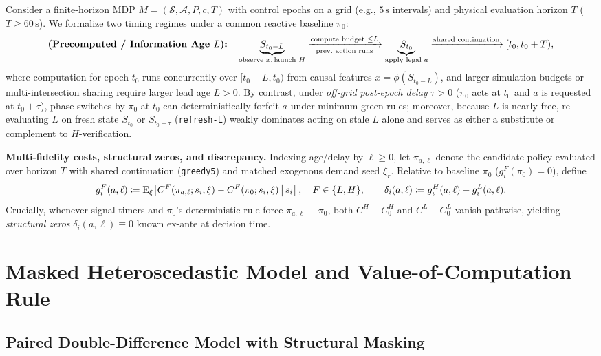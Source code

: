 Consider a finite-horizon MDP $M = (\mathcal{S}, \mathcal{A}, P, c, T)$ with control epochs on a grid (e.g., $5\,\mathrm{s}$ intervals) and physical evaluation horizon $T$ ($T \ge 60\,\mathrm{s}$). We formalize two timing regimes under a common reactive baseline $\pi_0$:
\[
\text{\textbf{(Precomputed / Information Age $L$):}}\quad
\underbrace{S_{t_0 - L}}_{\text{observe } x,\, \text{launch } H}
\xrightarrow[\text{prev.\ action runs}]{\text{compute budget } \le L}
\underbrace{S_{t_0}}_{\text{apply legal } a}
\xrightarrow{\text{shared continuation}}
[t_0, t_0 + T),
\]
where computation for epoch $t_0$ runs concurrently over $[t_0 - L, t_0)$ from causal features $x = \phi(S_{t_0 - L})$, and larger simulation budgets or multi-intersection sharing require larger lead age $L > 0$. By contrast, under \emph{off-grid post-epoch delay} $\tau > 0$ ($\pi_0$ acts at $t_0$ and $a$ is requested at $t_0 + \tau$), phase switches by $\pi_0$ at $t_0$ can deterministically forfeit $a$ under minimum-green rules; moreover, because $L$ is nearly free, re-evaluating $L$ on fresh state $S_{t_0}$ or $S_{t_0 + \tau}$ (\texttt{refresh-L}) weakly dominates acting on stale $L$ alone and serves as either a substitute or complement to $H$-verification.

\textbf{Multi-fidelity costs, structural zeros, and discrepancy.}
Indexing age/delay by $\ell \ge 0$, let $\pi_{a,\ell}$ denote the candidate policy evaluated over horizon $T$ with shared continuation (\texttt{greedy5}) and matched exogenous demand seed $\xi_r$. Relative to baseline $\pi_0$ ($g^F_i(\pi_0)=0$), define
\begin{equation}\label{eq:discrepancy-def}
g^F_i(a,\ell) \coloneqq \operatorname{E}_\xi\!\left[C^F(\pi_{a,\ell}; s_i, \xi) - C^F(\pi_0; s_i, \xi) \,\middle|\, s_i\right], \quad F \in \{L, H\},
\qquad
\delta_i(a,\ell) \coloneqq g^H_i(a,\ell) - g^L_i(a,\ell).
\end{equation}
Crucially, whenever signal timers and $\pi_0$'s deterministic rule force $\pi_{a,\ell} \equiv \pi_0$, both $C^H - C^H_0$ and $C^L - C^L_0$ vanish pathwise, yielding \emph{structural zeros} $\delta_i(a,\ell) \equiv 0$ known ex-ante at decision time.

\section{Masked Heteroscedastic Model and Value-of-Computation Rule}

\subsection{Paired Double-Difference Model with Structural Masking}

